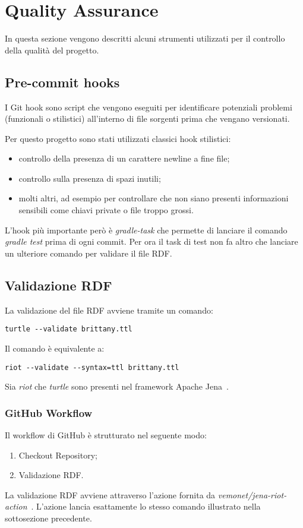 \section{Quality Assurance}
In questa sezione vengono descritti alcuni strumenti utilizzati per il controllo della qualità del progetto.

\subsection{Pre-commit hooks}
I Git hook sono script che vengono eseguiti per identificare potenziali problemi (funzionali o stilistici) all'interno di file sorgenti prima che vengano versionati.\newline

\noindent Per questo progetto sono stati utilizzati classici hook stilistici:
\begin{itemize}
	\item controllo della presenza di un carattere newline a fine file;
	\item controllo sulla presenza di spazi inutili;
	\item molti altri, ad esempio per controllare che non siano presenti informazioni sensibili come chiavi private o file troppo grossi.
\end{itemize}

\noindent L'hook più importante però è \textit{gradle-task} che permette di lanciare il comando \textit{gradle test} prima di ogni commit.
Per ora il task di test non fa altro che lanciare un ulteriore comando per validare il file RDF.

\subsection{Validazione RDF}
La validazione del file RDF avviene tramite un comando:
\begin{verbatim}
turtle --validate brittany.ttl
\end{verbatim}
Il comando è equivalente a:
\begin{verbatim}
riot --validate --syntax=ttl brittany.ttl
\end{verbatim}
Sia \textit{riot} che \textit{turtle} sono presenti nel framework Apache Jena~\cite{ApacheJe75:online}.

\subsubsection{GitHub Workflow}
Il workflow di GitHub è strutturato nel seguente modo:
\begin{enumerate}
	\item Checkout Repository;
	\item Validazione RDF.
\end{enumerate}

\noindent La validazione RDF avviene attraverso l'azione fornita da \textit{vemonet/jena-riot-action}~\cite{vemonetj43:online}. L'azione lancia esattamente lo stesso comando illustrato nella sottosezione precedente.
